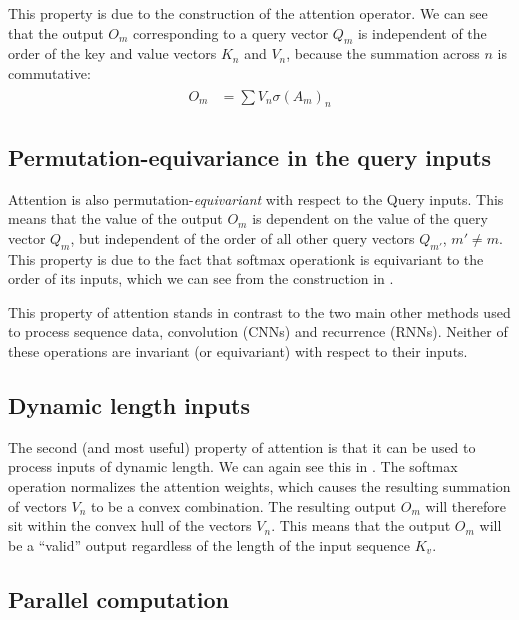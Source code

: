 This property is due to the construction of the attention operator. We can see that the output $O_m$ corresponding to a query vector $Q_m$ is independent of the order of the key and value vectors $K_n$ and $V_n$, because the summation across $n$ is commutative:
\begin{align}
\label{eqn:attn-perm-invariance}
\begin{aligned}
    O_m &= \sum V_n \sigma(A_{m})_n
\end{aligned}
\end{align}

\subsection{Permutation-equivariance in the query inputs}

Attention is also permutation-\textit{equivariant} with respect to the Query inputs. This means that the value of the output $O_m$ is dependent on the value of the query vector $Q_m$, but independent of the order of all other query vectors $Q_{m'}$, $m' ≠ m$.
This property is due to the fact that softmax operationk is equivariant to the order of its inputs, which we can see from the construction in .

This property of attention stands in contrast to the two main other methods used to process sequence data, convolution (CNNs) and recurrence (RNNs). Neither of these operations are invariant (or equivariant) with respect to their inputs.

\subsection{Dynamic length inputs}

The second (and most useful) property of attention is that it can be used to process inputs of dynamic length. We can again see this in . The softmax operation normalizes the attention weights, which causes the resulting summation of vectors $V_n$ to be a convex combination. The resulting output $O_m$ will therefore sit within the convex hull of the vectors $V_n$. This means that the output $O_m$ will be a ``valid'' output regardless of the length of the input sequence $K_v$.

\subsection{Parallel computation}

